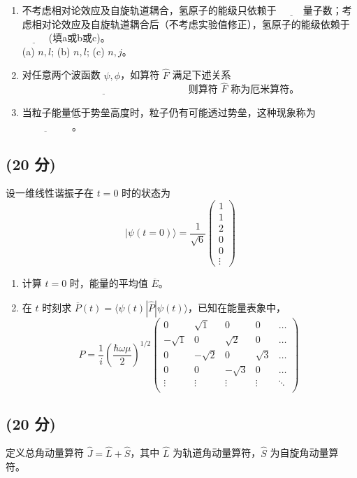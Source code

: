 \begin{enumerate}
    \item 不考虑相对论效应及自旋轨道耦合，氢原子的能级只依赖于 $\underline{\hspace{1cm}}$量子数；考虑相对论效应及自旋轨道耦合后（不考虑实验值修正），氢原子的能级依赖于 $\underline{\hspace{1cm}}$ (填a或b或c)。\\
   (a) $n, l$;  (b) $n, l$;  (c) $n, j$。
    \item 对任意两个波函数 $\psi, \phi$，如算符 $\hat{F}$ 满足下述关系 $\underline{\hspace{7cm}}$ 则算符 $\hat{F}$ 称为厄米算符。

    \item 当粒子能量低于势垒高度时，粒子仍有可能透过势垒，这种现象称为$\underline{\hspace{2cm}}$ 。
\end{enumerate}
\subsection{(20 分)}
设一维线性谐振子在 $t = 0$ 时的状态为
\[
|\psi(t=0)\rangle = \frac{1}{\sqrt{6}}
\begin{pmatrix}
1 \\
1 \\
2 \\
0 \\
0 \\
\vdots
\end{pmatrix}~
\]

\begin{enumerate}
    \item  计算 $t = 0$ 时，能量的平均值 $\overline E$。
    
    \item  在 $t$ 时刻求 $\overline P(t) = \langle \psi(t) | \hat{P} | \psi(t) \rangle$，已知在能量表象中，
    \[
    P = \frac{1}{i} \left(\frac{\hbar \omega \mu}{2}\right)^{1/2}
    \begin{pmatrix}
    0 & \sqrt{1} & 0 & 0 & \dots \\
    -\sqrt{1} & 0 & \sqrt{2} & 0 & \dots \\
    0 & -\sqrt{2} & 0 & \sqrt{3} & \dots \\
    0 & 0 & -\sqrt{3} & 0 & \dots \\
    \vdots & \vdots & \vdots & \vdots & \ddots \\
    \end{pmatrix}~
    \]
\end{enumerate}
\subsection{(20 分)}
定义总角动量算符 $\hat{J} = \hat{L} + \hat{S}$，其中 $\hat{L}$ 为轨道角动量算符，$\hat{S}$ 为自旋角动量算符。

